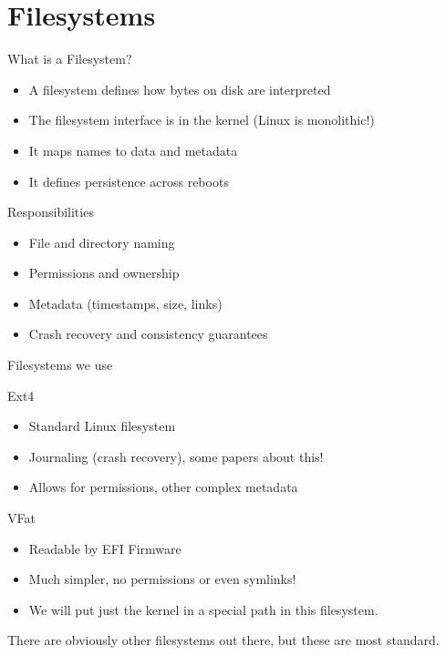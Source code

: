 \documentclass{../lecture}
\begin{document}
\section{Filesystems}

\begin{frame}{What is a Filesystem?}
  \begin{itemize}
    \item A filesystem defines how bytes on disk are interpreted
    \item The filesystem interface is in the kernel (Linux is monolithic!)
    \item It maps names to data and metadata
    \item It defines persistence across reboots
  \end{itemize}
  \begin{block}{Responsibilities}
    \begin{itemize}
      \item File and directory naming
      \item Permissions and ownership
      \item Metadata (timestamps, size, links)
      \item Crash recovery and consistency guarantees
    \end{itemize}
  \end{block}
\end{frame}

\begin{frame}{Filesystems we use}
  \begin{block}{Ext4}
    \begin{itemize}
      \item Standard Linux filesystem
      \item Journaling (crash recovery), some papers about this!
      \item Allows for permissions, other complex metadata
    \end{itemize}
  \end{block}
  \begin{block}{VFat}
    \begin{itemize}
      \item Readable by EFI Firmware
      \item Much simpler, no permissions or even symlinks!
      \item We will put just the kernel in a special path in this filesystem.
    \end{itemize}
  \end{block}
  There are obviously other filesystems out there, but these are most standard.
\end{frame}
\end{document}
